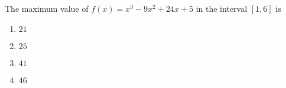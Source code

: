\iffalse
\chapter{2012}
\author{AI24BTECH11030}
\section{ee}
\fi
   
    \item The maximum value of \( f(x) = x^3 - 9x^2 + 24x + 5 \) in the interval \([1, 6]\) is

    \begin{multicols}{4}
        \begin{enumerate}
            \item $21$
            \item $25$
            \item $41$
            \item $46$
        \end{enumerate}
    \end{multicols}

